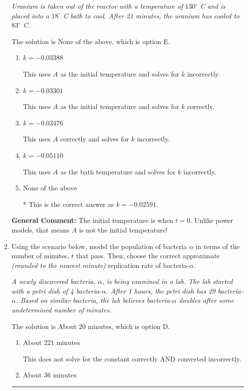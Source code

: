 \documentclass{extbook}[14pt]
\newcommand{\litem}[1]{\item #1

\rule{\textwidth}{0.4pt}}
\begin{document}
\begin{enumerate}
{\begin{center}
    \textit{ Uranium is taken out of the reactor with a temperature of $130^{\circ}$ C and is placed into a $18^{\circ}$ C bath to cool. After 21 minutes, the uranium has cooled to $83^{\circ}$ C. }
\end{center}
The solution is \( \text{None of the above} \), which is option E.\begin{enumerate}[label=\Alph*.]
\item \( k = -0.03388 \)

This uses $A$ as the initial temperature and solves for $k$ incorrectly.
\item \( k = -0.03301 \)

This uses $A$ as the initial temperature and solves for $k$ correctly.
\item \( k = -0.03476 \)

This uses $A$ correctly and solves for $k$ incorrectly.
\item \( k = -0.05110 \)

This uses $A$ as the bath temperature and solves for $k$ incorrectly.
\item \( \text{None of the above} \)

* This is the correct answer as $k = -0.02591$.
\end{enumerate}

\textbf{General Comment:} The initial temperature is when $t = 0$. Unlike power models, that means $A$ is not the initial temperature!
}
\litem{
Using the scenario below, model the population of bacteria $\alpha$ in terms of the number of minutes, $t$ that pass. Then, choose the correct approximate \textit{(rounded to the nearest minute)} replication rate of bacteria-$\alpha$.

\begin{center}
    \textit{ A newly discovered bacteria, $\alpha$, is being examined in a lab. The lab started with a petri dish of 4 bacteria-$\alpha$. After 1 hours, the petri dish has 29 bacteria-$\alpha$. Based on similar bacteria, the lab believes bacteria-$\alpha$ doubles after some undetermined number of minutes. }
\end{center}
The solution is \( \text{About } 20 \text{ minutes} \), which is option D.\begin{enumerate}[label=\Alph*.]
\item \( \text{About } 221 \text{ minutes} \)

This does not solve for the constant correctly AND converted incorrectly.
\item \( \text{About } 36 \text{ minutes} \)


\end{enumerate}}
\end{enumerate}
\end{document}
